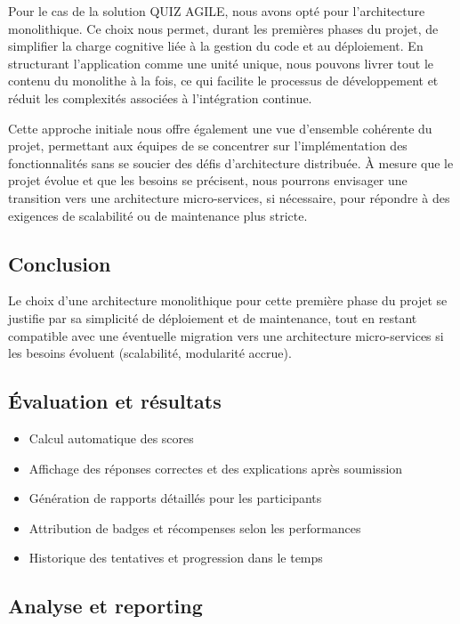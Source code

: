\documentclass[12pt,a4paper]{report}
\begin{document}
Pour le cas de la solution QUIZ AGILE, nous avons opté pour l'architecture monolithique. Ce choix nous permet, durant les premières phases du projet, de simplifier la charge cognitive liée à la gestion du code et au déploiement. En structurant l'application comme une unité unique, nous pouvons livrer tout le contenu du monolithe à la fois, ce qui facilite le processus de développement et réduit les complexités associées à l'intégration continue.

Cette approche initiale nous offre également une vue d'ensemble cohérente du projet, permettant aux équipes de se concentrer sur l'implémentation des fonctionnalités sans se soucier des défis d'architecture distribuée. À mesure que le projet évolue et que les besoins se précisent, nous pourrons envisager une transition vers une architecture micro-services, si nécessaire, pour répondre à des exigences de scalabilité ou de maintenance plus stricte.

\subsection{Conclusion}

Le choix d'une architecture monolithique pour cette première phase du projet se justifie par sa simplicité de déploiement et de maintenance, tout en restant compatible avec une éventuelle migration vers une architecture micro-services si les besoins évoluent (scalabilité, modularité accrue).

\subsection{Évaluation et résultats}

\begin{itemize}
\item Calcul automatique des scores
\item Affichage des réponses correctes et des explications après soumission
\item Génération de rapports détaillés pour les participants
\item Attribution de badges et récompenses selon les performances
\item Historique des tentatives et progression dans le temps
\end{itemize}

\subsection{Analyse et reporting}
\end{document}
